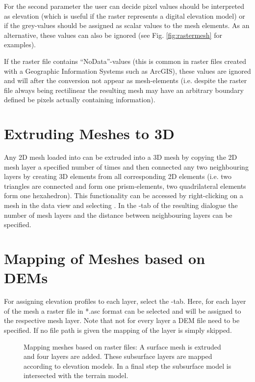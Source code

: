 For the second parameter the user can decide pixel values should be interpreted as elevation (which is useful if the raster represents a digital elevation model) or if the grey-values should be assigned as scalar values to the mesh elements. As an alternative, these values can also be ignored (see Fig. \ref{fig:rastermesh} for examples).

If the raster file contains ``NoData''-values (this is common in raster files created with a Geographic Information Systems such as ArcGIS), these values are ignored and will after the conversion not appear as mesh-elements (i.e. despite the raster file always being rectilinear the resulting mesh may have an arbitrary boundary defined be pixels actually containing information).

\section{Extruding Meshes to 3D}

Any 2D mesh loaded into \ogs can be extruded into a 3D mesh by copying the 2D mesh layer a specified number of times and then connected any two neighbouring layers by creating 3D elements from all corresponding 2D elements (i.e. two triangles are connected and form one prism-elements, two quadrilateral elements form one hexahedron). This functionality can be accessed by right-clicking on a mesh in the data view and selecting . In the -tab of the resulting dialogue the number of mesh layers and the distance between neighbouring layers can be specified.

\section{Mapping of Meshes based on DEMs}

For assigning elevation profiles to each layer, select the -tab. Here, for each layer of the mesh a raster file in *.asc format can be selected and will be assigned to the respective mesh layer. Note that not for every layer a DEM file need to be specified. If no file path is given the mapping of the layer is simply skipped.

\begin{figure}[tb]
\begin{center}
\enspace
{}\enspace
{}
\end{center}
\caption{Mapping meshes based on raster files: A surface mesh is extruded and four layers are added. These subsurface layers are mapped according to elevation models. In a final step the subsurface model is intersected with the terrain model.}
\label{fig:RasterMapping}
\end{figure}

